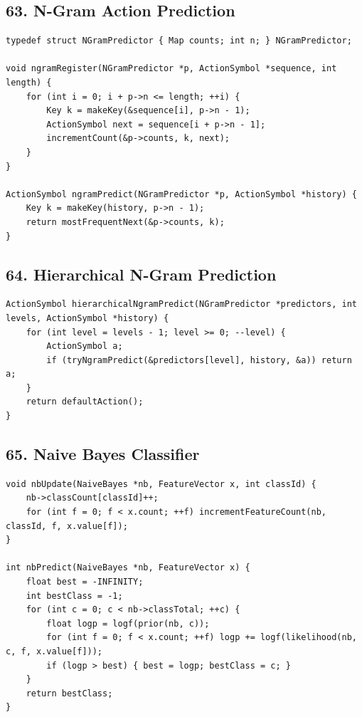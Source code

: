 \documentclass[10pt,letterpaper]{article}
\begin{document}
\subsection*{63. N-Gram Action Prediction}
{}

\begin{verbatim}
typedef struct NGramPredictor { Map counts; int n; } NGramPredictor;

void ngramRegister(NGramPredictor *p, ActionSymbol *sequence, int length) {
    for (int i = 0; i + p->n <= length; ++i) {
        Key k = makeKey(&sequence[i], p->n - 1);
        ActionSymbol next = sequence[i + p->n - 1];
        incrementCount(&p->counts, k, next);
    }
}

ActionSymbol ngramPredict(NGramPredictor *p, ActionSymbol *history) {
    Key k = makeKey(history, p->n - 1);
    return mostFrequentNext(&p->counts, k);
}
\end{verbatim}

\subsection*{64. Hierarchical N-Gram Prediction}
{}

\begin{verbatim}
ActionSymbol hierarchicalNgramPredict(NGramPredictor *predictors, int levels, ActionSymbol *history) {
    for (int level = levels - 1; level >= 0; --level) {
        ActionSymbol a;
        if (tryNgramPredict(&predictors[level], history, &a)) return a;
    }
    return defaultAction();
}
\end{verbatim}

\subsection*{65. Naive Bayes Classifier}
{}

\begin{verbatim}
void nbUpdate(NaiveBayes *nb, FeatureVector x, int classId) {
    nb->classCount[classId]++;
    for (int f = 0; f < x.count; ++f) incrementFeatureCount(nb, classId, f, x.value[f]);
}

int nbPredict(NaiveBayes *nb, FeatureVector x) {
    float best = -INFINITY;
    int bestClass = -1;
    for (int c = 0; c < nb->classTotal; ++c) {
        float logp = logf(prior(nb, c));
        for (int f = 0; f < x.count; ++f) logp += logf(likelihood(nb, c, f, x.value[f]));
        if (logp > best) { best = logp; bestClass = c; }
    }
    return bestClass;
}
\end{verbatim}
\end{document}
